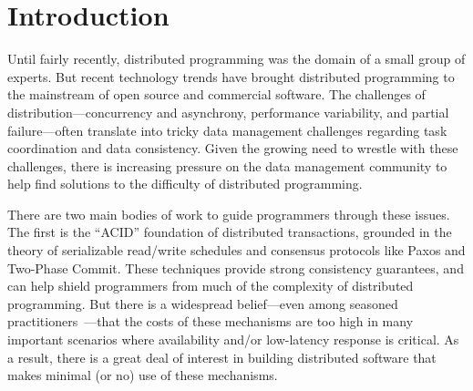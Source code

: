 \section{Introduction}
Until fairly recently, distributed programming was the domain of a small group of experts. But recent technology trends have brought distributed programming to the mainstream of open source and commercial software.  The challenges of distribution---concurrency and asynchrony, performance variability, and partial failure---often translate into tricky data management challenges regarding task coordination and data consistency.
Given the growing need to wrestle with these challenges, there is increasing pressure on the data management community to help find solutions to the difficulty of distributed programming.

There are two main bodies of work to guide programmers through these issues.  The first is the ``ACID'' foundation of distributed transactions, grounded in the theory of serializable read/write schedules and consensus protocols like Paxos and Two-Phase Commit.  These techniques provide strong consistency guarantees, and can help shield programmers from much of the complexity of distributed programming. But there is a widespread belief---even among seasoned practitioners~\cite{ladis}---that the costs of these mechanisms are too high in many important scenarios where availability and/or low-latency response is critical.
As a result, there is a great deal of interest in building distributed software that makes minimal (or no) use of these mechanisms.


